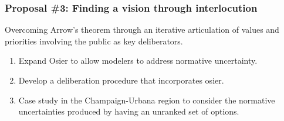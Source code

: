 \begin{frame}
    \frametitle{Proposal \#3: Finding a vision through interlocution}

    Overcoming Arrow's theorem through an iterative articulation of values and
    priorities involving the public as key deliberators.

    \begin{enumerate}
        \item Expand Osier to allow modelers to address normative uncertainty.
        \item Develop a deliberation procedure that incorporates osier.
        \item Case study in the Champaign-Urbana region to consider the
        normative uncertainties produced by having an unranked set of options.
    \end{enumerate}

\end{frame}